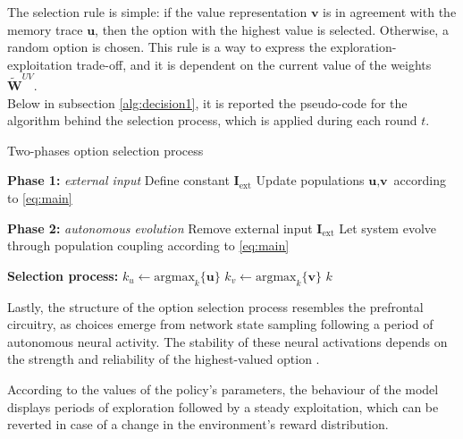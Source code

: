 \noindent The selection rule is simple: if the value representation $\textbf{v}$ is in agreement with the memory trace $\textbf{u}$, then the option with the highest value is selected. Otherwise, a random option is chosen.
This rule is a way to express the exploration-exploitation trade-off, and it is dependent on the current value of the weights $\widetilde{\textbf{W}}^{UV}$. \\ Below in subsection \ref{alg:decision1}, it is reported the pseudo-code for the algorithm behind the selection process, which is applied during each round $t$.


\begin{algorithm}[ht]
\caption{Two-phases option selection process}
\label{alg:decision}
\SetAlgoLined
{}


\textbf{Phase 1:} \textit{external input} 
Define constant $\textbf{I}_{\text{ext}}$\;
Update populations $\textbf{u}, \textbf{v}$ according to \ref{eq:main}\;

\textbf{Phase 2:} \textit{autonomous evolution} 
Remove external input $\textbf{I}_{\text{ext}}$\;
Let system evolve through population coupling according to \ref{eq:main}\;

\textbf{Selection process:}\;
$k_{u} \gets \text{argmax}_{k}\{\textbf{u}\}$\;
$k_{v} \gets \text{argmax}_{k}\{\textbf{v}\}$\;
\Return $k$
\end{algorithm}\label{alg:decision1}

\noindent Lastly, the structure of the option selection process resembles the prefrontal circuitry, as choices emerge from network state sampling following a period of autonomous neural activity. The stability of these neural activations depends on the strength and reliability of the highest-valued option \cite{backmanEffectsWorkingMemoryTraining2011, enelStableDynamicRepresentations2020}.

\noindent According to the values of the policy's parameters, the behaviour of the model displays periods of exploration followed by a steady exploitation, which can be reverted in case of a change in the environment's reward distribution.

